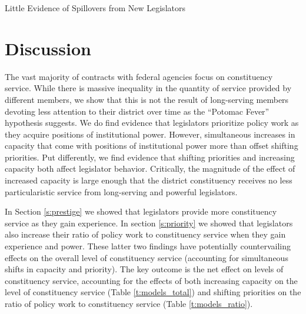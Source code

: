 \documentclass[12pt]{article}
\begin{document}
{   

\begin{table}[hbt!]
\caption{Little Evidence of Spillovers from New Legislators} \label{t:spill1}

\begin{minipage}{\textwidth}
\begin{center}

\end{center}
\end{minipage}
\end{table}

\section{Discussion}






The vast majority of contracts with federal agencies focus on constituency service. While there is massive inequality in the quantity of service provided by different members, we show that this is not the result of long-serving members devoting less attention to their district over time as the ``Potomac Fever'' hypothesis suggests. We do find evidence that legislators prioritize policy work as they acquire positions of institutional power. However, simultaneous increases in capacity that come with positions of institutional power more than offset shifting priorities. Put differently, we find evidence that shifting priorities and increasing capacity both affect legislator behavior. Critically, the magnitude of the effect of increased capacity is large enough that the district constituency receives no less particularistic service from long-serving and powerful legislators. 

In Section \ref{s:prestige} we showed that legislators provide more constituency service as they gain experience. In section \ref{s:priority} we showed that legislators also increase their ratio of policy work to constituency service when they gain experience and power. These latter two findings have potentially countervailing effects on the overall level of constituency service (accounting for simultaneous shifts in capacity and priority). The key outcome is the net effect on levels of constituency service, accounting for the effects of both increasing capacity on the level of constituency service (Table \ref{t:models_total}) and shifting priorities on the ratio of policy work to constituency service (Table \ref{t:models_ratio}).


}
\end{document}
